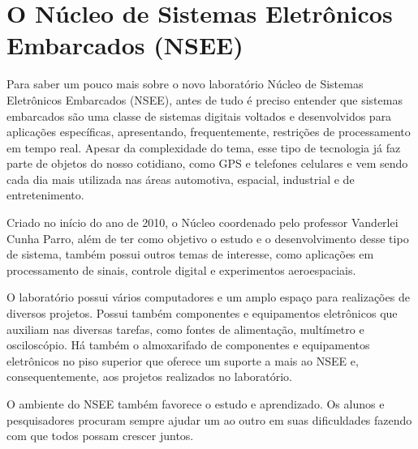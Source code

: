 \let\thefootnote\relax{}



\section{O Núcleo de Sistemas Eletrônicos Embarcados (NSEE)}
Para saber um pouco mais sobre o novo laboratório Núcleo de Sistemas Eletrônicos Embarcados (NSEE), antes de tudo é preciso entender que sistemas embarcados são uma classe de sistemas digitais voltados e desenvolvidos para aplicações específicas, apresentando, frequentemente, restrições de processamento em tempo real. Apesar da complexidade do tema, esse tipo de tecnologia já faz parte de objetos do nosso cotidiano, como GPS e telefones celulares e vem sendo cada dia mais utilizada nas áreas automotiva, espacial, industrial e de entretenimento.

Criado no início do ano de 2010, o Núcleo coordenado pelo professor Vanderlei Cunha Parro, além de ter como objetivo o estudo e o desenvolvimento desse tipo de sistema, também possui outros temas de interesse, como aplicações em processamento de sinais, controle digital e experimentos aeroespaciais.\cite{NovoLaboratorioNSEE:Online}

O laboratório possui vários computadores e um amplo espaço para realizações de diversos projetos. Possui também componentes e equipamentos eletrônicos que auxiliam nas diversas tarefas, como fontes de alimentação, multímetro e osciloscópio. Há também o almoxarifado de componentes e equipamentos eletrônicos no piso superior que oferece um suporte a mais ao NSEE e, consequentemente, aos projetos realizados no laboratório. 

O ambiente do NSEE também favorece o estudo e aprendizado. Os alunos e pesquisadores procuram sempre ajudar um ao outro em suas dificuldades fazendo com que todos possam crescer juntos.

